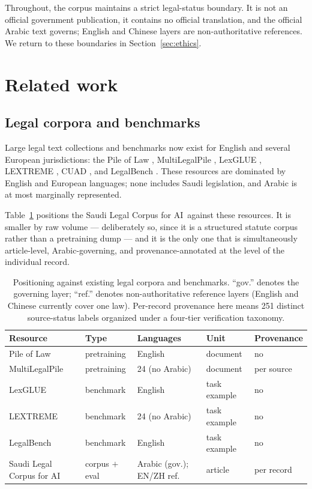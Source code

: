\documentclass[sn-basic]{sn-jnl}%
\newcommand{\corpusname}{Saudi Legal Corpus for AI}
\begin{document}
Throughout, the corpus maintains a strict legal-status boundary. It is not
an official government publication, it contains no official translation, and
the official Arabic text governs; English and Chinese layers are
non-authoritative references. We return to these boundaries in
Section~\ref{sec:ethics}.

\section{Related work}
\label{sec:related}

\subsection{Legal corpora and benchmarks}

Large legal text collections and benchmarks now exist for English and
several European jurisdictions: the Pile of Law
\citep{henderson2022pileoflaw}, MultiLegalPile
\citep{niklaus2024multilegalpile}, LexGLUE \citep{chalkidis2022lexglue},
LEXTREME \citep{niklaus2023lextreme}, CUAD \citep{hendrycks2021cuad}, and
LegalBench \citep{guha2023legalbench}. These resources are dominated by
English and European languages; none includes Saudi legislation, and Arabic
is at most marginally represented.

Table~\ref{tab:comparison} positions the \corpusname\ against these
resources. It is smaller by raw volume --- deliberately so, since it is a
structured statute corpus rather than a pretraining dump --- and it is the
only one that is simultaneously article-level, Arabic-governing, and
provenance-annotated at the level of the individual record.

\begin{table}[t]
\centering
\footnotesize
\begin{tabular}{@{}lllll@{}}
\toprule
\textbf{Resource} & \textbf{Type} & \textbf{Languages} & \textbf{Unit} & \textbf{Provenance} \\
\midrule
Pile of Law & pretraining & English & document & no \\
MultiLegalPile & pretraining & 24 (no Arabic) & document & per source \\
LexGLUE & benchmark & English & task example & no \\
LEXTREME & benchmark & 24 (no Arabic) & task example & no \\
LegalBench & benchmark & English & task example & no \\
\midrule
\corpusname & corpus $+$ eval & Arabic (gov.); EN/ZH ref. & article & per record \\
\bottomrule
\end{tabular}
\caption{Positioning against existing legal corpora and benchmarks.
``gov.'' denotes the governing layer; ``ref.'' denotes non-authoritative
reference layers (English and Chinese currently cover one law). Per-record
provenance here means 251 distinct source-status labels organized under a
four-tier verification taxonomy.}
\label{tab:comparison}
\end{table}
\end{document}
